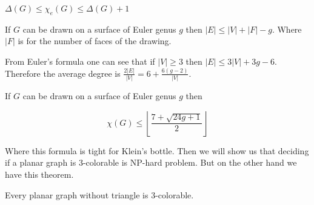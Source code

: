 \begin{thm}[Vizing]
	$\Delta(G) \leq \chi_e(G) \leq \Delta(G) + 1$
\end{thm}

\begin{thm}
	If $G$ can be drawn on a surface of Euler genus $g$ then $|E| \leq |V| + |F| - g$. Where $|F|$ is for the number of faces of the drawing.
\end{thm}

From Euler's formula one can see that if $|V| \geq 3$ then $|E| \leq 3 |V| + 3g - 6$. Therefore the average degree is $\frac{2|E|}{|V|} = 6 + \frac{6(g-2)}{|V|}$.

\begin{thm}
	If $G$ can be drawn on a surface of Euler genus $g$ then
	
	$$
	\chi(G) \leq \left \lfloor \frac{7 + \sqrt{24 g + 1}}{2} \right \rfloor
	$$
\end{thm}

Where this formula is tight for Klein's bottle. Then we will show us that deciding if a planar graph is 3-colorable is NP-hard problem. But on the other hand we have this theorem.

\begin{thm}[Grötsch]
	Every planar graph without triangle is 3-colorable.
\end{thm}